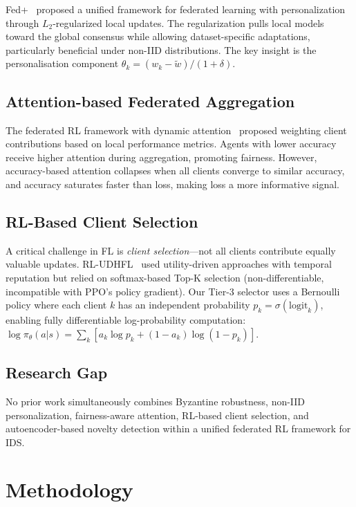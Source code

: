 \documentclass[conference]{IEEEtran}
\begin{document}
Fed+~\cite{fedplus} proposed a unified framework for federated learning with personalization through $L_2$-regularized local updates. The regularization pulls local models toward the global consensus while allowing dataset-specific adaptations, particularly beneficial under non-IID distributions. The key insight is the personalisation component $\theta_k = (w_k - \tilde{w}) / (1 + \delta)$.

\subsection{Attention-based Federated Aggregation}

The federated RL framework with dynamic attention~\cite{fedrl_attention} proposed weighting client contributions based on local performance metrics. Agents with lower accuracy receive higher attention during aggregation, promoting fairness. However, accuracy-based attention collapses when all clients converge to similar accuracy, and accuracy saturates faster than loss, making loss a more informative signal.

\subsection{RL-Based Client Selection}

A critical challenge in FL is \emph{client selection}---not all clients contribute equally valuable updates. RL-UDHFL~\cite{rludhfl} used utility-driven approaches with temporal reputation but relied on softmax-based Top-K selection (non-differentiable, incompatible with PPO's policy gradient). Our Tier-3 selector uses a Bernoulli policy where each client $k$ has an independent probability $p_k = \sigma(\mathrm{logit}_k)$, enabling fully differentiable log-probability computation: $\log \pi_{\theta}(a|s) = \sum_k [a_k \log p_k + (1-a_k)\log(1-p_k)]$.

\subsection{Research Gap}

No prior work simultaneously combines Byzantine robustness, non-IID personalization, fairness-aware attention, RL-based client selection, and autoencoder-based novelty detection within a unified federated RL framework for IDS.

\section{Methodology}
\label{sec:methodology}
\end{document}
